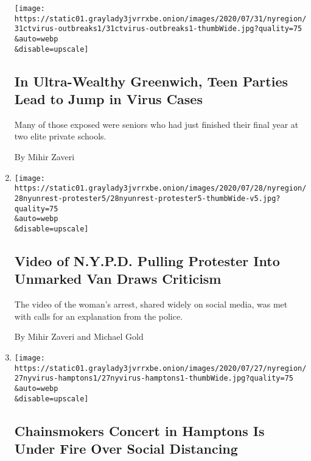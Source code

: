 \begin{enumerate}
  \texttt{[image: https://static01.graylady3jvrrxbe.onion/images/2020/07/31/nyregion/31ctvirus-outbreaks1/31ctvirus-outbreaks1-thumbWide.jpg?quality=75\\\&auto=webp\\\&disable=upscale]}

  \hypertarget{in-ultra-wealthy-greenwich-teen-parties-lead-to-jump-in-virus-cases}{%
  \subsection{In Ultra-Wealthy Greenwich, Teen Parties Lead to Jump in
  Virus
  Cases}\label{in-ultra-wealthy-greenwich-teen-parties-lead-to-jump-in-virus-cases}}

  Many of those exposed were seniors who had just finished their final
  year at two elite private schools.

  By Mihir Zaveri
\item
  \href{/2020/07/28/nyregion/nypd-protester-van.html}{}

  \texttt{[image: https://static01.graylady3jvrrxbe.onion/images/2020/07/28/nyregion/28nyunrest-protester5/28nyunrest-protester5-thumbWide-v5.jpg?quality=75\\\&auto=webp\\\&disable=upscale]}

  \hypertarget{video-of-nypd-pulling-protester-into-unmarked-van-draws-criticism}{%
  \subsection{Video of N.Y.P.D. Pulling Protester Into Unmarked Van
  Draws
  Criticism}\label{video-of-nypd-pulling-protester-into-unmarked-van-draws-criticism}}

  The video of the woman's arrest, shared widely on social media, was
  met with calls for an explanation from the police.

  By Mihir Zaveri and Michael Gold
\item
  \href{/2020/07/27/nyregion/hamptons-chainsmokers-concert-social-distancing.html}{}

  \texttt{[image: https://static01.graylady3jvrrxbe.onion/images/2020/07/27/nyregion/27nyvirus-hamptons1/27nyvirus-hamptons1-thumbWide.jpg?quality=75\\\&auto=webp\\\&disable=upscale]}

  \hypertarget{chainsmokers-concert-in-hamptons-is-under-fire-over-social-distancing}{%
  \subsection{Chainsmokers Concert in Hamptons Is Under Fire Over Social
  Distancing}\label{chainsmokers-concert-in-hamptons-is-under-fire-over-social-distancing}}


\end{enumerate}
